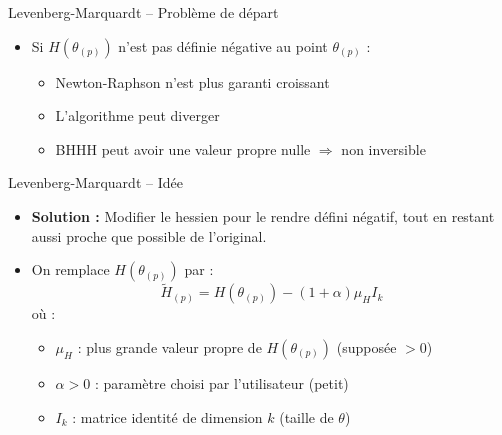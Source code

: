 \documentclass[11pt,aspectratio=169]{beamer}
\begin{document}
\begin{frame}{Levenberg-Marquardt -- Problème de départ}

\begin{itemize}

\item Si $H(\theta_{(p)})$ n'est pas définie négative au point $\theta_{(p)}$ :
  \begin{itemize}
    \item Newton-Raphson n'est plus garanti croissant\newline
    \item L'algorithme peut diverger\newline
    \item BHHH peut avoir une valeur propre nulle $\Rightarrow$ non inversible\newline
  \end{itemize}

\end{itemize}

\begin{center}
\end{center}

\end{frame}

\begin{frame}{Levenberg-Marquardt -- Idée}

\begin{itemize}

\item \textbf{Solution :} Modifier le hessien pour le rendre défini négatif, tout en restant aussi proche que possible de l'original.\newline

\item On remplace $H(\theta_{(p)})$ par :
  \[
  \boxed{\tilde{H}_{(p)} = H(\theta_{(p)}) - (1 + \alpha)\mu_H I_k}
  \]
  où :
  \begin{itemize}
    \item $\mu_H$ : plus grande valeur propre de $H(\theta_{(p)})$ (supposée $> 0$)\newline
    \item $\alpha > 0$ : paramètre choisi par l'utilisateur (petit)\newline
    \item $I_k$ : matrice identité de dimension $k$ (taille de $\theta$)
  \end{itemize}

\end{itemize}

\end{frame}
\end{document}
